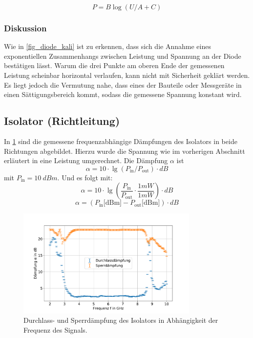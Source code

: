 \documentclass[
	a4paper,
	12pt,
	pagesize,
	ngerman
]{scrartcl}
\begin{document}
	\begin{equation}
		\label{eq_inv_kali}
		P = B\log{(U/A+C)}
	\end{equation}
	\subsubsection*{Diskussion}

	Wie in \cref{fig_diode_kali} ist zu erkennen, dass sich die Annahme eines exponentiellen Zusammenhangs zwischen Leistung und Spannung an der Diode bestätigen lässt.
	Warum die drei Punkte am oberen Ende der gemessenen Leistung scheinbar horizontal verlaufen, kann nicht mit Sicherheit geklärt werden.
	Es liegt jedoch die Vermutung nahe, dass eines der Bauteile oder Messgeräte in einen Sättigungsbereich kommt, sodass die gemessene Spannung konstant wird.

	\subsection{Isolator (Richtleitung)}
	In \cref{fig_isolator} sind die gemessene frequenzabhängige Dämpfungen des Isolators in beide Richtungen abgebildet.
	Hierzu wurde die Spannung wie im vorherigen Abschnitt erläutert in eine Leistung umgerechnet.
	Die Dämpfung $\alpha$ ist
	\begin{equation}
		\alpha = 10 \cdot \lg{(P_{\text{in}}/P_{\text{out}})} \cdot \si{dB}
	\end{equation}
  mit $P_\text{in}=\SI{10}{dBm}$.
	Und es folgt mit:
	\begin{equation}
		\alpha = 10 \cdot \lg{\left(\frac{P_{\text{in}}}{P_{\text{out}}} \cdot \frac{1mW}{1mW}\right)} \cdot\si{dB}
	\end{equation}
	\begin{equation}
		\alpha = (P_\text{in} \text{[dBm]} - P_\text{out} \text{[dBm]} ) \cdot\si{dB}
	\end{equation}
	\begin{figure}[H]
		\includegraphics[width=0.8\textwidth]{img/isolator}
		\centering
		\caption{
		Durchlass- und Sperrdämpfung des Isolators in Abhängigkeit der Frequenz des Signals.
		}
		\label{fig_isolator}
		\centering
	\end{figure}
\end{document}
